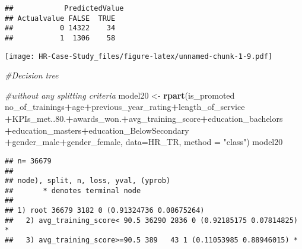 \documentclass[
]{article}
\newenvironment{Shaded}{\begin{snugshade}}{\end{snugshade}}
\newcommand{\CommentTok}[1]{\textcolor[rgb]{0.56,0.35,0.01}{\textit{#1}}}
\newcommand{\DataTypeTok}[1]{\textcolor[rgb]{0.13,0.29,0.53}{#1}}
\newcommand{\FloatTok}[1]{\textcolor[rgb]{0.00,0.00,0.81}{#1}}
\newcommand{\KeywordTok}[1]{\textcolor[rgb]{0.13,0.29,0.53}{\textbf{#1}}}
\newcommand{\NormalTok}[1]{#1}
\newcommand{\OperatorTok}[1]{\textcolor[rgb]{0.81,0.36,0.00}{\textbf{#1}}}
\newcommand{\OtherTok}[1]{\textcolor[rgb]{0.56,0.35,0.01}{#1}}
\newcommand{\StringTok}[1]{\textcolor[rgb]{0.31,0.60,0.02}{#1}}
\begin{document}
\begin{verbatim}
##            PredictedValue
## Actualvalue FALSE  TRUE
##           0 14322    34
##           1  1306    58
\end{verbatim}

\begin{Shaded}
\end{Shaded}

\texttt{[image: HR-Case-Study\_files/figure-latex/unnamed-chunk-1-9.pdf]}

\begin{Shaded}
\begin{Highlighting}[]
\CommentTok{#Decision tree }

\CommentTok{#without any splitting criteria}
\NormalTok{model20 <-}\StringTok{ }\KeywordTok{rpart}\NormalTok{(is_promoted }\OperatorTok{~}\StringTok{ }\NormalTok{no_of_trainings}\OperatorTok{+}\NormalTok{age}\OperatorTok{+}\NormalTok{previous_year_rating}\OperatorTok{+}\NormalTok{length_of_service}
                 \OperatorTok{+}\NormalTok{KPIs_met..}\FloatTok{80.}\OperatorTok{+}\NormalTok{awards_won.}\OperatorTok{+}\NormalTok{avg_training_score}\OperatorTok{+}\NormalTok{education_bachelors}
                 \OperatorTok{+}\NormalTok{education_masters}\OperatorTok{+}\NormalTok{education_BelowSecondary}
                 \OperatorTok{+}\NormalTok{gender_male}\OperatorTok{+}\NormalTok{gender_female,  }
                 \DataTypeTok{data=}\NormalTok{HR_TR, }
                 \DataTypeTok{method =} \StringTok{"class"}\NormalTok{)}
\NormalTok{model20}
\end{Highlighting}
\end{Shaded}

\begin{verbatim}
## n= 36679 
## 
## node), split, n, loss, yval, (yprob)
##       * denotes terminal node
## 
## 1) root 36679 3182 0 (0.91324736 0.08675264)  
##   2) avg_training_score< 90.5 36290 2836 0 (0.92185175 0.07814825) *
##   3) avg_training_score>=90.5 389   43 1 (0.11053985 0.88946015) *
\end{verbatim}
\end{document}
